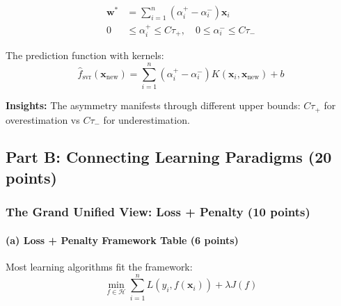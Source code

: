 \documentclass[12pt,a4paper]{article}
\theoremstyle{definition}
\begin{document}
\begin{align}
\mathbf{w}^* &= \sum_{i=1}^n (\alpha_i^+ - \alpha_i^-) \mathbf{x}_i\\
0 &\leq \alpha_i^+ \leq C\tau_+, \quad 0 \leq \alpha_i^- \leq C\tau_-
\end{align}

The prediction function with kernels:
\begin{equation}
\boxed{\hat{f}_{\text{svr}}(\mathbf{x}_{\text{new}}) = \sum_{i=1}^n (\alpha_i^+ - \alpha_i^-) K(\mathbf{x}_i, \mathbf{x}_{\text{new}}) + b}
\end{equation}

\textbf{Insights:} The asymmetry manifests through different upper bounds: $C\tau_+$ for overestimation vs $C\tau_-$ for underestimation.

\subsection{Part B: Connecting Learning Paradigms (20 points)}

\subsubsection{The Grand Unified View: Loss + Penalty (10 points)}

\paragraph{(a) Loss + Penalty Framework Table (6 points)}

Most learning algorithms fit the framework:
\begin{equation}
\min_{f \in \mathcal{H}} \sum_{i=1}^n L(y_i, f(\mathbf{x}_i)) + \lambda J(f)
\end{equation}
\end{document}
